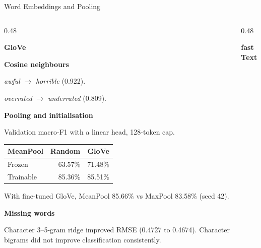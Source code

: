 \begin{frame}[t]{Word Embeddings and Pooling}
\begin{columns}[T,onlytextwidth]
\begin{column}{0.48\textwidth}
\raggedright\footnotesize
\textbf{GloVe}\par\smallskip
\textbf{Cosine neighbours}\par
\textit{awful} $\to$ \textit{horrible} (0.922).\par
\textit{overrated} $\to$ \textit{underrated} (0.809).\par

\smallskip
\textbf{Pooling and initialisation}\par
{\scriptsize Validation macro-F1 with a linear head, 128-token cap.\par
\smallskip
\begin{tabular*}{\linewidth}{@{\extracolsep{\fill}}lrr@{}}
\hline
MeanPool & Random & GloVe \\
\hline
Frozen & 63.57\% & 71.48\% \\
Trainable & 85.36\% & 85.51\% \\
\hline
\end{tabular*}\par}
\smallskip
With fine-tuned GloVe, MeanPool 85.66\% vs MaxPool 83.58\% (seed 42).

\smallskip
\textbf{Missing words}\par
Character 3--5-gram ridge improved RMSE (0.4727 to 0.4674). Character bigrams did not improve classification consistently.
\end{column}
\begin{column}{0.48\textwidth}
\raggedright\footnotesize\textbf{fastText}\par
\end{column}
\end{columns}
\end{frame}

